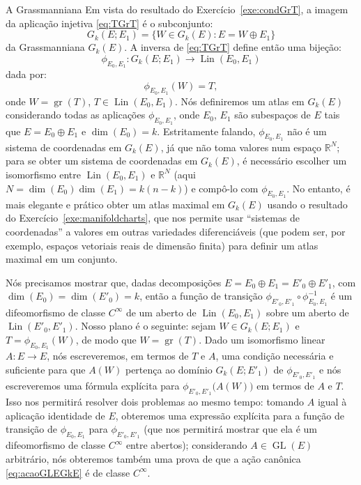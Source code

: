 \documentclass[oneside,11pt]{amsart}
\newcommand{\R}{\mathds R}
\DeclareMathOperator{\Gr}{gr}
\DeclareMathOperator{\Lin}{Lin}
\DeclareMathOperator{\Dim}{dim}
\DeclareMathOperator{\GL}{GL}
\theoremstyle{remark}\newtheorem{exercise}{Exercício}[section]
\theoremstyle{plain}\newtheorem{teo}{Teorema}[section]
\theoremstyle{plain}\newtheorem{lem}[teo]{Lema}
\theoremstyle{plain}\newtheorem{prop}[teo]{Proposição}
\theoremstyle{definition}\newtheorem{defin}[teo]{Definição}
\theoremstyle{remark}\newtheorem{rem}[teo]{Observação}
\theoremstyle{definition}\newtheorem{example}[teo]{Exemplo}
\numberwithin{equation}{section}
\begin{document}
\begin{section}{A Grassmanniana}
Em vista do resultado do Exercício~\ref{exe:condGrT}, a imagem da aplicação injetiva \eqref{eq:TGrT} é o subconjunto:
\[G_k(E;E_1)=\big\{W\in G_k(E):E=W\oplus E_1\big\}\]
da Grassmanniana $G_k(E)$. A inversa de \eqref{eq:TGrT} define então uma bijeção:
\[\phi_{E_0,E_1}:G_k(E;E_1)\longrightarrow\Lin(E_0,E_1)\]
dada por:
\[\phi_{E_0,E_1}(W)=T,\]
onde $W=\Gr(T)$, $T\in\Lin(E_0,E_1)$. Nós definiremos um atlas em $G_k(E)$ considerando todas as aplicações $\phi_{E_0,E_1}$, onde $E_0$, $E_1$ são subespaços
de $E$ tais que $E=E_0\oplus E_1$ e $\Dim(E_0)=k$. Estritamente falando, $\phi_{E_0,E_1}$ não é um sistema de coordenadas em $G_k(E)$, já que não toma
valores num espaço $\R^N$; para se obter um sistema de coordenadas em $G_k(E)$, é necessário escolher um isomorfismo entre $\Lin(E_0,E_1)$
e $\R^N$ (aqui $N=\Dim(E_0)\Dim(E_1)=k(n-k)$) e compô-lo com $\phi_{E_0,E_1}$. No entanto, é mais elegante e prático obter um atlas maximal em $G_k(E)$
usando o resultado do Exercício~\ref{exe:manifoldcharts}, que nos permite usar ``sistemas de coordenadas'' a valores em outras variedades diferenciáveis
(que podem ser, por exemplo, espaços vetoriais reais de dimensão finita) para definir um atlas maximal em um conjunto.

Nós precisamos mostrar que, dadas decomposições $E=E_0\oplus E_1=E'_0\oplus E'_1$, com $\Dim(E_0)=\Dim(E'_0)=k$, então a função de transição
$\phi_{E'_0,E'_1}\circ\phi_{E_0,E_1}^{-1}$ é um difeomorfismo de classe $C^\infty$ de um aberto de $\Lin(E_0,E_1)$ sobre um aberto de $\Lin(E'_0,E'_1)$.
Nosso plano é o seguinte: sejam $W\in G_k(E;E_1)$ e $T=\phi_{E_0,E_1}(W)$, de modo que $W=\Gr(T)$. Dado um isomorfismo linear $A:E\to E$, nós escreveremos,
em termos de $T$ e $A$, uma condição necessária e suficiente para que $A(W)$ pertença ao domínio $G_k(E;E'_1)$ de $\phi_{E'_0,E'_1}$ e nós escreveremos
uma fórmula explícita para $\phi_{E'_0,E'_1}\big(A(W)\big)$ em termos de $A$ e $T$. Isso nos permitirá resolver dois problemas ao mesmo tempo: tomando
$A$ igual à aplicação identidade de $E$, obteremos uma expressão explícita para a função de transição de $\phi_{E_0,E_1}$ para $\phi_{E'_0,E'_1}$
(que nos permitirá mostrar que ela é um difeomorfismo de classe $C^\infty$ entre abertos); considerando $A\in\GL(E)$ arbitrário, nós obteremos também
uma prova de que a ação canônica \eqref{eq:acaoGLEGkE} é de classe $C^\infty$.


\end{section}
\end{document}
